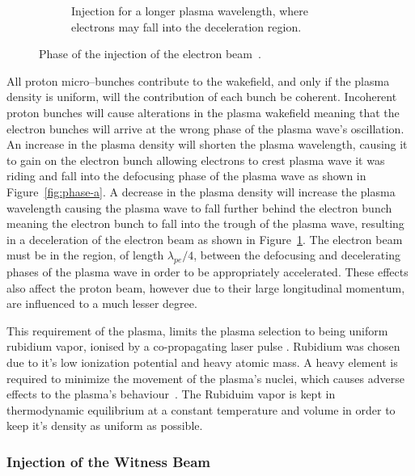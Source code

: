 \begin{figure}[!tb]
\begin{subfigure}{\linewidth}
		\caption{Injection for a longer plasma wavelength, where electrons may
		fall into the deceleration region.}
		\label{fig:phase-c}
	\end{subfigure}
	\caption{
		Phase of the injection of the electron
		beam~\cite{wiedemann2007particle}.
	}
	\label{fig:phases}
\end{figure}


All proton micro--bunches contribute to the wakefield, and only if the plasma
density is uniform, will the contribution of each bunch be coherent. Incoherent
proton bunches will cause alterations in the plasma wakefield meaning that the
electron bunches will arrive at the wrong phase of the plasma wave's
oscillation. An increase in the plasma density will shorten the plasma
wavelength, causing it to gain on the electron bunch allowing electrons to crest
plasma wave it was riding and fall into the defocusing phase of the plasma wave
as shown in Figure~\ref{fig:phase-a}. A decrease in the plasma density will
increase the plasma wavelength causing the plasma wave to fall further behind
the electron bunch meaning the electron bunch to fall into the trough of the
plasma wave, resulting in a deceleration of the electron beam as shown in
Figure~\ref{fig:phase-c}.  The electron beam must be in the region, of length
\(\lambda_{pe}/4\), between the defocusing and decelerating phases of the plasma
wave in order to be appropriately accelerated. These effects also affect the
proton beam, however due to their large longitudinal momentum, are influenced to
a much lesser degree.

This requirement of the plasma, limits the plasma selection to being uniform
rubidium vapor, ionised by a co-propagating laser pulse \cite{oz2014novel,
oz2014bja}. Rubidium was chosen due to it's low ionization potential and heavy
atomic mass. A heavy element is required to minimize the movement of the
plasma's nuclei, which causes adverse effects to the plasma's
behaviour~\cite{vieira2012nj,vieira2014bqa}. The Rubiduim vapor is kept in
thermodynamic equilibrium at a constant temperature and volume in order to keep
it's density as uniform as possible.


\subsubsection{Injection of the Witness Beam}

